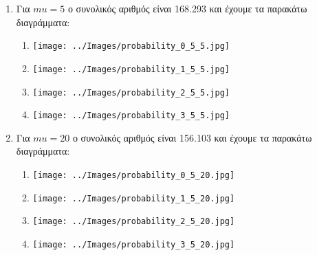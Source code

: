 \documentclass[12pt]{article}
\begin{document}
\begin{enumerate}
\begin{enumerate}
                \item{}
                    Για $mu = 5$ ο συνολικός αριθμός είναι 168.293 και έχουμε τα παρακάτω διαγράμματα:
                    \begin{enumerate}
                        \item{}
                            \begin{center}
                                \texttt{[image: ../Images/probability\_0\_5\_5.jpg]}
                            \end{center}
                        \item{}
                            \begin{center}
                                \texttt{[image: ../Images/probability\_1\_5\_5.jpg]}
                            \end{center}
                        \item{}
                            \begin{center}
                                \texttt{[image: ../Images/probability\_2\_5\_5.jpg]}
                            \end{center}
                        \item{}
                            \begin{center}
                                \texttt{[image: ../Images/probability\_3\_5\_5.jpg]}
                            \end{center}
                    \end{enumerate}

            \item{}
                Για $mu = 20$ ο συνολικός αριθμός είναι 156.103 και έχουμε τα παρακάτω διαγράμματα:
                \begin{enumerate}
                    \item{}
                        \begin{center}
                            \texttt{[image: ../Images/probability\_0\_5\_20.jpg]}
                        \end{center}
                    \item{}
                        \begin{center}
                            \texttt{[image: ../Images/probability\_1\_5\_20.jpg]}
                        \end{center}
                    \item{}
                        \begin{center}
                            \texttt{[image: ../Images/probability\_2\_5\_20.jpg]}
                        \end{center}
                    \item{}
                        \begin{center}
                            \texttt{[image: ../Images/probability\_3\_5\_20.jpg]}
                        \end{center}
                \end{enumerate}



\end{enumerate}
\end{enumerate}
\end{document}
